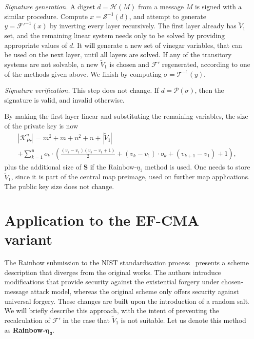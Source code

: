 \documentclass[openright]{report}
\begin{document}
\emph{Signature generation.}
A digest $d = \mathcal{H}(M)$ from a message $M$ is signed with a similar
procedure. Compute $x = \mathcal{S}^{-1}(d)$, and attempt to generate
$y = \mathcal{F}'^{-1}(x)$ by inverting every layer recursively. The first
layer already has $\widetilde{V}_{1}$ set, and the remaining linear system
needs only to be solved by providing appropriate values of $d$. It will
generate a new set of vinegar variables, that can be used on the next layer,
until all layers are solved. If any of the transitory systems are not solvable,
a new $\widetilde{V}_{1}$ is chosen and $\mathcal{F}'$ regenerated, according
to one of the methods given above. We finish by computing
$\sigma = \mathcal{T}^{-1}(y)$.

\emph{Signature verification.}
This step does not change. If $d = \mathcal{P}(\sigma)$, then the signature is
valid, and invalid otherwise.

By making the first layer linear and substituting the remaining variables, the
size of the private key is now
\begin{multline}
  |\mathcal{K}_{Pr}^{\eta}| = m^{2} + m + n^{2} + n
    + |\widetilde{V}_{1}| \\
    + \sum_{k = 1}^{u} o_{k} \cdot \left( \frac{(v_{k} - v_{1})(v_{k} - v_{1} + 1)}{2}
      + (v_{k} - v_{1}) \cdot o_{k} + (v_{k + 1} - v_{1}) + 1 \right),
\end{multline}
plus the additional size of $\mathbf{S}$ if the Rainbow-$\eta_{1}$ method is
used. One needs to store $\widetilde{V}_{1}$, since it is part of the central
map preimage, used on further map applications. The public key size does not
change.

\section{Application to the EF-CMA variant}\label{sec:efcma}

The Rainbow submission to the NIST standardisation
process~\cite{Ding:201712:misc} presents a scheme description that diverges
from the original works. The authors introduce modifications that provide
security against the existential forgery under chosen-message attack
model, whereas the original scheme only offers security against universal
forgery. These changes are built upon the introduction of a random salt. We
will briefly describe this approach, with the intent of preventing the
recalculation of $\mathcal{F}'$ in the case that $\widetilde{V}_{1}$ is not
suitable. Let us denote this method as \textbf{Rainbow-}$\mathbf{\eta_{3}}$.
\end{document}
